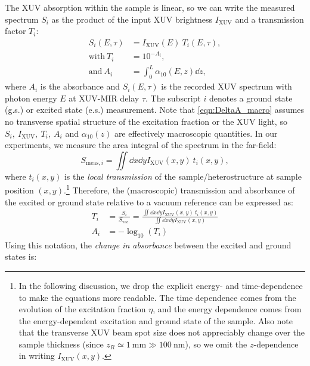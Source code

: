 The XUV absorption within the sample is linear, so we can write the measured spectrum $S_i$ as the product of the input XUV brightness $I_{\textrm{XUV}}$ and a transmission factor $T_i$:
\begin{equation}
\begin{aligned}
S_i(E, \tau) &= I_{\textrm{XUV}}(E) \ T_i(E, \tau), \\
\textrm{with} \ T_i &= 10^{- A_i}, \\
\textrm{and} \ A_i &= \int_{0}^{L} \alpha_{10}(E, z) \dd{z},
\end{aligned}
\label{eqn:DeltaA_macro}
\end{equation}
where $A_i$ is the absorbance and $S_i(E,\tau)$ is the recorded XUV spectrum with photon energy $E$ at XUV-MIR delay $\tau$. The subscript $i$ denotes a ground state (g.s.) or excited state (e.s.) measurement. Note that \cref{eqn:DeltaA_macro} assumes no transverse spatial structure of the excitation fraction or the XUV light, so $S_i, \ I_{\textrm{XUV}}, \ T_i, \ A_i$ and $\alpha_{10}(z)$ are effectively macroscopic quantities. In our experiments, we measure the area integral of the spectrum in the far-field:
\begin{equation}
S_{\textrm{meas},i} = \iint \dd{x} \dd{y} I_{\textrm{XUV}}(x,y) \ t_i(x,y),
\end{equation}
where $t_i(x,y)$ is the \textit{local transmission} of the sample/heterostructure at sample position $(x,y)$.\footnote{In the following discussion, we drop the explicit energy- and time-dependence to make the equations more readable. The time dependence comes from the evolution of the excitation fraction $\eta$, and the energy dependence comes from the energy-dependent excitation and ground state of the sample. Also note that the transverse XUV beam spot size does not appreciably change over the sample thickness (since $z_R \simeq 1 \ \textrm{mm} \gg 100 \ \textrm{nm}$), so we omit the $z$-dependence in writing $I_{\textrm{XUV}}(x,y)$.}  Therefore, the (macroscopic) transmission and absorbance of the excited or ground state relative to a vacuum reference can be expressed as:
\begin{equation}
\begin{aligned}
T_i &= \frac{S_i}{S_{\textrm{vac.}}} = \frac{\iint \dd{x} \dd{y} I_{\textrm{XUV}}(x,y) \ t_i(x,y)}{ \iint \dd{x} \dd{y} I_{\textrm{XUV}}(x,y)} \\
A_i &= - \log_{10}(T_i)
\end{aligned}
\end{equation}
Using this notation, the \textit{change in absorbance} between the excited and ground states is:
